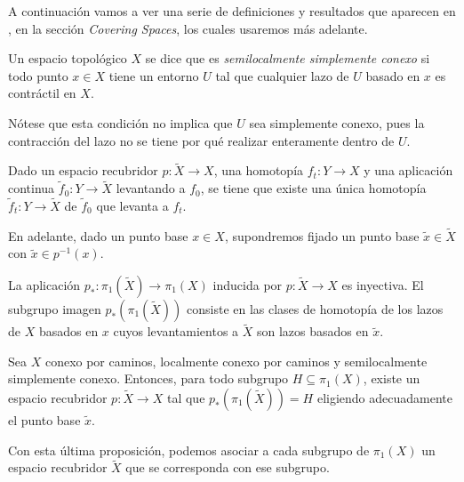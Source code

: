 \documentclass[TFG.tex]{subfiles}
\begin{document}
A continuación vamos a ver una serie de definiciones y resultados que aparecen en \cite{Hatcher}, en la sección \emph{Covering Spaces}, los cuales usaremos más adelante.

\begin{defi}
Un espacio topológico $X$ se dice que es \emph{semilocalmente simplemente conexo} si todo punto $x\in X$ tiene un entorno $U$ tal que cualquier lazo de $U$ basado en $x$ es contráctil en $X$. 
\end{defi}
Nótese que esta condición no implica que $U$ sea simplemente conexo, pues la contracción del lazo no se tiene por qué realizar enteramente dentro de $U$.

\begin{prop}
Dado un espacio recubridor $p:\widetilde{X}\to X$, una homotopía $f_t:Y\to X$ y una aplicación continua $\widetilde{f}_0:Y\to\widetilde{X}$ levantando a $f_0$, se tiene que existe una única homotopía $\widetilde{f}_t:Y\to\widetilde{X}$ de $\widetilde{f}_0$ que levanta a $f_t$.
\end{prop}

En adelante, dado un punto base $x\in X$, supondremos fijado un punto base $\widetilde{x}\in\widetilde{X}$ con $\widetilde{x}\in p^{-1}(x)$.

\begin{prop}\label{inyect}
La aplicación $p_*:\pi_1(\widetilde{X})\to\pi_1(X)$ inducida por $p:\widetilde{X}\to X$ es inyectiva. El subgrupo imagen $p_*(\pi_1(\widetilde{X}))$ consiste en las clases de homotopía de los lazos de $X$ basados en $x$ cuyos levantamientos a $\widetilde{X}$ son lazos basados en $\widetilde{x}$.
\end{prop}


\begin{prop}
Sea $X$ conexo por caminos, localmente conexo por caminos y semilocalmente simplemente conexo. Entonces, para todo subgrupo $H\subseteq \pi_1(X)$, existe un espacio recubridor $p:\widetilde{X}\to X$ tal que $p_*(\pi_1(\widetilde{X}))=H$ eligiendo adecuadamente el punto base $\widetilde{x}$. 
\end{prop}

Con esta última proposición, podemos asociar a cada subgrupo de $\pi_1(X)$ un espacio recubridor $\widetilde{X}$ que se corresponda con ese subgrupo.

\end{document}
